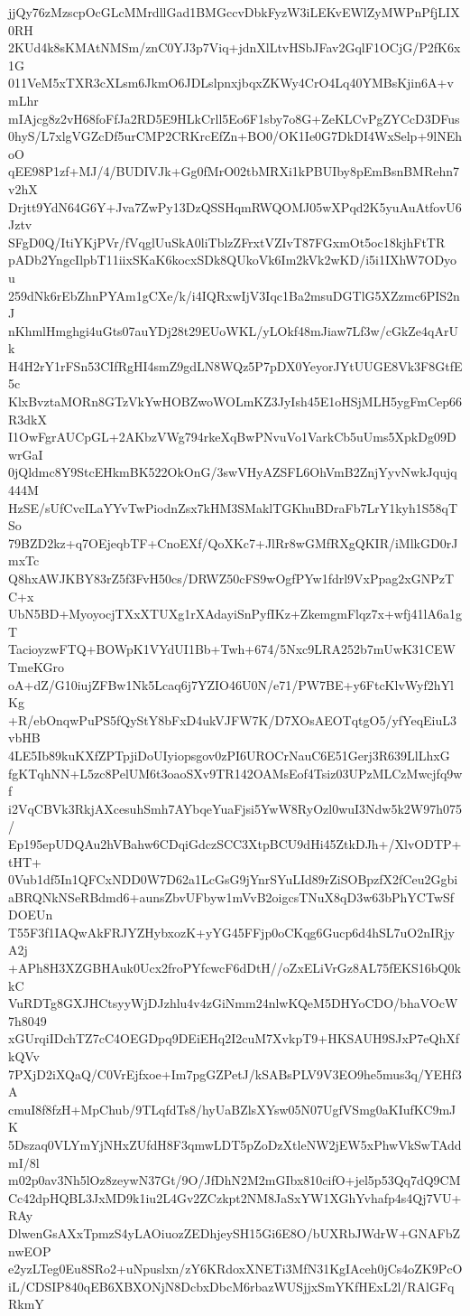 jjQy76zMzscpOcGLcMMrdllGad1BMGccvDbkFyzW3iLEKvEWlZyMWPnPfjLIX0RH
2KUd4k8sKMAtNMSm/znC0YJ3p7Viq+jdnXlLtvHSbJFav2GqlF1OCjG/P2fK6x1G
011VeM5xTXR3cXLsm6JkmO6JDLslpnxjbqxZKWy4CrO4Lq40YMBsKjin6A+vmLhr
mIAjcg8z2vH68foFfJa2RD5E9HLkCrll5Eo6F1sby7o8G+ZeKLCvPgZYCcD3DFus
0hyS/L7xlgVGZcDf5urCMP2CRKrcEfZn+BO0/OK1Ie0G7DkDI4WxSelp+9lNEhoO
qEE98P1zf+MJ/4/BUDIVJk+Gg0fMrO02tbMRXi1kPBUIby8pEmBsnBMRehn7v2hX
Drjtt9YdN64G6Y+Jva7ZwPy13DzQSSHqmRWQOMJ05wXPqd2K5yuAuAtfovU6Jztv
SFgD0Q/ItiYKjPVr/fVqglUuSkA0liTblzZFrxtVZIvT87FGxmOt5oc18kjhFtTR
pADb2YngcIlpbT11iixSKaK6kocxSDk8QUkoVk6Im2kVk2wKD/i5i1IXhW7ODyou
259dNk6rEbZhnPYAm1gCXe/k/i4IQRxwIjV3Iqc1Ba2msuDGTlG5XZzmc6PIS2nJ
nKhmlHmghgi4uGts07auYDj28t29EUoWKL/yLOkf48mJiaw7Lf3w/cGkZe4qArUk
H4H2rY1rFSn53CIfRgHI4smZ9gdLN8WQz5P7pDX0YeyorJYtUUGE8Vk3F8GtfE5c
KlxBvztaMORn8GTzVkYwHOBZwoWOLmKZ3JyIsh45E1oHSjMLH5ygFmCep66R3dkX
I1OwFgrAUCpGL+2AKbzVWg794rkeXqBwPNvuVo1VarkCb5uUms5XpkDg09DwrGaI
0jQldmc8Y9StcEHkmBK522OkOnG/3swVHyAZSFL6OhVmB2ZnjYyvNwkJqujq444M
HzSE/sUfCvcILaYYvTwPiodnZsx7kHM3SMaklTGKhuBDraFb7LrY1kyh1S58qTSo
79BZD2kz+q7OEjeqbTF+CnoEXf/QoXKc7+JlRr8wGMfRXgQKIR/iMlkGD0rJmxTc
Q8hxAWJKBY83rZ5f3FvH50cs/DRWZ50cFS9wOgfPYw1fdrl9VxPpag2xGNPzTC+x
UbN5BD+MyoyocjTXxXTUXg1rXAdayiSnPyfIKz+ZkemgmFlqz7x+wfj41lA6a1gT
TacioyzwFTQ+BOWpK1VYdUI1Bb+Twh+674/5Nxc9LRA252b7mUwK31CEWTmeKGro
oA+dZ/G10iujZFBw1Nk5Lcaq6j7YZIO46U0N/e71/PW7BE+y6FtcKlvWyf2hYlKg
+R/ebOnqwPuPS5fQyStY8bFxD4ukVJFW7K/D7XOsAEOTqtgO5/yfYeqEiuL3vbHB
4LE5Ib89kuKXfZPTpjiDoUIyiopsgov0zPI6UROCrNauC6E51Gerj3R639LlLhxG
fgKTqhNN+L5zc8PelUM6t3oaoSXv9TR142OAMsEof4Tsiz03UPzMLCzMwcjfq9wf
i2VqCBVk3RkjAXcesuhSmh7AYbqeYuaFjsi5YwW8RyOzl0wuI3Ndw5k2W97h075/
Ep195epUDQAu2hVBahw6CDqiGdczSCC3XtpBCU9dHi45ZtkDJh+/XlvODTP+tHT+
0Vub1df5In1QFCxNDD0W7D62a1LcGsG9jYnrSYuLId89rZiSOBpzfX2fCeu2Ggbi
aBRQNkNSeRBdmd6+aunsZbvUFbyw1mVvB2oigcsTNuX8qD3w63bPhYCTwSfDOEUn
T55F3f1IAQwAkFRJYZHybxozK+yYG45FFjp0oCKqg6Gucp6d4hSL7uO2nIRjyA2j
+APh8H3XZGBHAuk0Ucx2froPYfcwcF6dDtH//oZxELiVrGz8AL75fEKS16bQ0kkC
VuRDTg8GXJHCtsyyWjDJzhlu4v4zGiNmm24nlwKQeM5DHYoCDO/bhaVOcW7h8049
xGUrqiIDchTZ7cC4OEGDpq9DEiEHq2I2cuM7XvkpT9+HKSAUH9SJxP7eQhXfkQVv
7PXjD2iXQaQ/C0VrEjfxoe+Im7pgGZPetJ/kSABsPLV9V3EO9he5mus3q/YEHf3A
cmuI8f8fzH+MpChub/9TLqfdTs8/hyUaBZlsXYsw05N07UgfVSmg0aKIufKC9mJK
5Dszaq0VLYmYjNHxZUfdH8F3qmwLDT5pZoDzXtleNW2jEW5xPhwVkSwTAddmI/8l
m02p0av3Nh5lOz8zeywN37Gt/9O/JfDhN2M2mGIbx810cifO+jel5p53Qq7dQ9CM
Cc42dpHQBL3JxMD9k1iu2L4Gv2ZCzkpt2NM8JaSxYW1XGhYvhafp4s4Qj7VU+RAy
DlwenGsAXxTpmzS4yLAOiuozZEDhjeySH15Gi6E8O/bUXRbJWdrW+GNAFbZnwEOP
e2yzLTeg0Eu8SRo2+uNpuslxn/zY6KRdoxXNETi3MfN31KgIAceh0jCs4oZK9PcO
iL/CDSIP840qEB6XBXONjN8DcbxDbcM6rbazWUSjjxSmYKfHExL2l/RAlGFqRkmY
